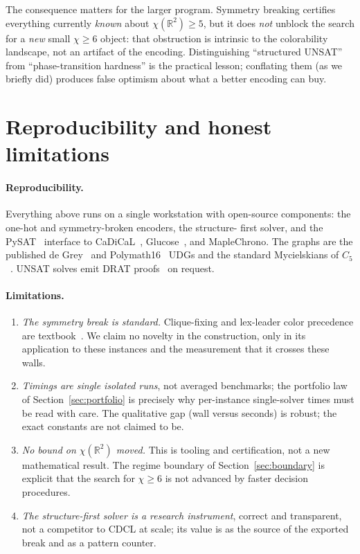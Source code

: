 \documentclass[11pt]{article}
\theoremstyle{definition}
\newcommand{\R}{\mathbb{R}}
\newcommand{\chrom}{\chi}
\begin{document}
The consequence matters for the larger program. Symmetry breaking certifies
everything currently \emph{known} about $\chrom(\R^2) \ge 5$, but it does
\emph{not} unblock the search for a \emph{new} small $\chrom \ge 6$ object: that
obstruction is intrinsic to the colorability landscape, not an artifact of the
encoding. Distinguishing ``structured UNSAT'' from ``phase-transition hardness''
is the practical lesson; conflating them (as we briefly did) produces false
optimism about what a better encoding can buy.

\section{Reproducibility and honest limitations}
\label{sec:repro}

\paragraph{Reproducibility.} Everything above runs on a single workstation with
open-source components: the one-hot and symmetry-broken encoders, the structure-
first solver, and the PySAT~\cite{IgnatievPySAT} interface to
CaDiCaL~\cite{BiereCadical}, Glucose~\cite{AudemardSimon2009}, and MapleChrono.
The graphs are the published de Grey~\cite{deGrey2018} and
Polymath16~\cite{Polymath16, Parts2020} UDGs and the standard Mycielskians of
$C_5$~\cite{Mycielski1955}. UNSAT solves emit DRAT
proofs~\cite{WetzlerHeuleHunt2014} on request.

\paragraph{Limitations.}
\begin{enumerate}
  \item \emph{The symmetry break is standard.} Clique-fixing and lex-leader color
        precedence are textbook~\cite{CrawfordSymmetry1996, SakallahSymmetry2009}.
        We claim no novelty in the construction, only in its application to these
        instances and the measurement that it crosses these walls.
  \item \emph{Timings are single isolated runs}, not averaged benchmarks; the
        portfolio law of Section~\ref{sec:portfolio} is precisely why per-instance
        single-solver times must be read with care. The qualitative gap (wall
        versus seconds) is robust; the exact constants are not claimed to be.
  \item \emph{No bound on $\chrom(\R^2)$ moved.} This is tooling and
        certification, not a new mathematical result. The regime boundary of
        Section~\ref{sec:boundary} is explicit that the search for $\chrom \ge 6$
        is not advanced by faster decision procedures.
  \item \emph{The structure-first solver is a research instrument}, correct and
        transparent, not a competitor to CDCL at scale; its value is as the source
        of the exported break and as a pattern counter.
\end{enumerate}
\end{document}
